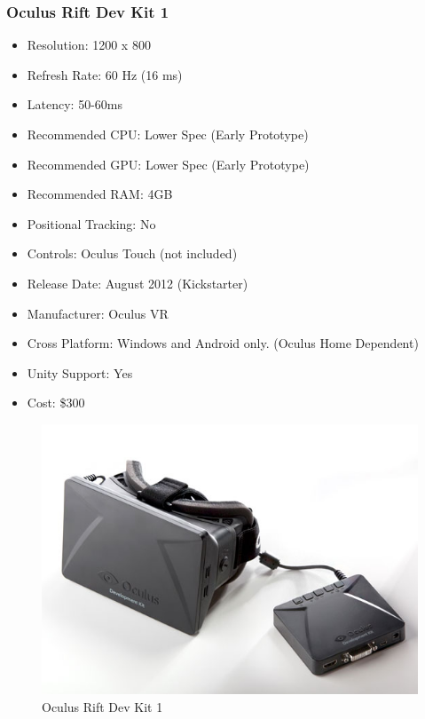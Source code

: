 \documentclass[a4paper,10pt]{article}
\begin{document}
\subsubsection{Oculus Rift Dev Kit 1}
\begin{itemize}
	\item Resolution: 1200 x 800
	\item Refresh Rate: 60 Hz (16 ms)
	\item Latency: 50-60ms
	\item Recommended CPU: Lower Spec (Early Prototype)
	\item Recommended GPU: Lower Spec (Early Prototype)
	\item Recommended RAM: 4GB
	\item Positional Tracking: No
	\item Controls: Oculus Touch (not included) 
	\item Release Date: August 2012 (Kickstarter)
	\item Manufacturer: Oculus VR
	\item Cross Platform: Windows and Android only. (Oculus Home Dependent)
	\item Unity Support: Yes
	\item Cost: \$300
\end{itemize}
	\begin{figure}[H]
	\includegraphics[width=\linewidth,height=\paperheight,keepaspectratio]{dk1.jpg}
	\caption{Oculus Rift Dev Kit 1}
	\label{fig:Riftdk1Img}
	\end{figure}
	\pagebreak
\end{document}
